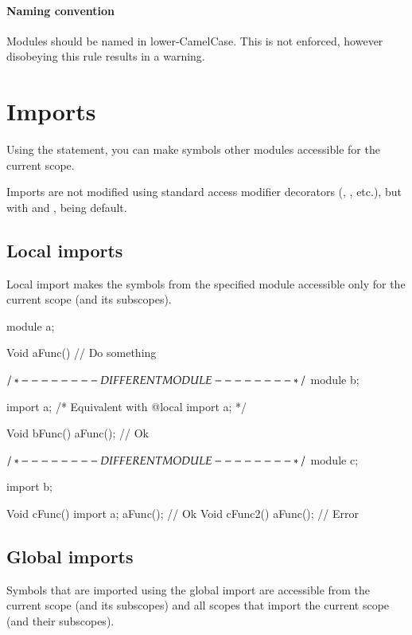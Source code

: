 \paragraph{Naming convention} Modules should be named in lower-CamelCase. This is not enforced, however disobeying this rule results in a warning.

\section{Imports} \label{imports}
\begin{grammar}
	   \kwd{;}
\end{grammar}

Using the  statement, you can make symbols other modules accessible for the current scope.

Imports are not modified using standard access modifier decorators (, , etc.), but with  and ,  being default.

\subsection{Local imports} \label{decorator:local}
Local import makes the symbols from the specified module accessible only for the current scope (and its subscopes).

\begin{code}
module a;

Void aFunc() {
	// Do something
}

$/* - - - - - - - - DIFFERENT MODULE - - - - - - - - */$
module b;

import a; /* Equivalent with @local import a; */

Void bFunc() {
	aFunc(); // Ok
}

$/* - - - - - - - - DIFFERENT MODULE - - - - - - - - */$
module c;

import b;

Void cFunc() {
	import a;
	aFunc(); // Ok
}
Void cFunc2() {
	aFunc(); // Error	
}
\end{code}

\subsection{Global imports} \label{decorator:global}
Symbols that are imported using the global import are accessible from the current scope (and its subscopes) and all scopes that import the current scope (and their subscopes).

